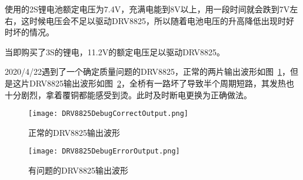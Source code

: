 使用的2S锂电池额定电压为7.4V，充满电能到8V以上，用一段时间就会跌到7V左右，这时候电压会不足以驱动DRV8825，所以随着电池电压的升高降低出现时好时坏的情况。

当即购买了3S的锂电，11.2V的额定电压足以驱动DRV8825。

2020/4/22遇到了一个确定质量问题的DRV8825，正常的两片输出波形如图~\ref{fig:DRV8825DebugCorrectOutput}，但是这片DRV8825输出波形如图~\ref{fig:DRV8825DebugErrorOutput}，全桥有一路坏了导致半个周期短路，其发热也十分剧烈，拿着覆铜都能感受到烫。此时及时断电更换为正确做法。

\begin{figure}[htbp]
    \centering
    \texttt{[image: DRV8825DebugCorrectOutput.png]}
    \caption{正常的DRV8825输出波形}
    \label{fig:DRV8825DebugCorrectOutput}
\end{figure}

\begin{figure}[htbp]
    \centering
    \texttt{[image: DRV8825DebugErrorOutput.png]}
    \caption{有问题的DRV8825输出波形}
    \label{fig:DRV8825DebugErrorOutput}
\end{figure}